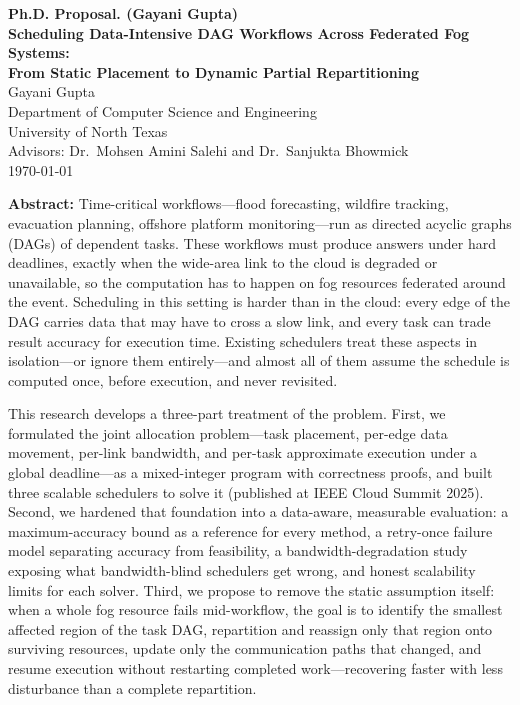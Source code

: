 \documentclass[11pt]{article}
\begin{document}
\begin{center}
{\Large \textbf{Ph.D. Proposal. (Gayani Gupta)}}\\[14pt]
{\LARGE \textbf{Scheduling Data-Intensive DAG Workflows Across
Federated Fog Systems:}}\\[6pt]
{\LARGE \textbf{From Static Placement to Dynamic Partial
Repartitioning}}\\[18pt]
Gayani Gupta\\
Department of Computer Science and Engineering\\
University of North Texas\\
Advisors: Dr.\ Mohsen Amini Salehi and Dr.\ Sanjukta Bhowmick\\[8pt]
\today
\end{center}

\vspace{12pt}

\noindent\textbf{Abstract:}
Time-critical workflows---flood forecasting, wildfire tracking,
evacuation planning, offshore platform monitoring---run as
directed acyclic graphs (DAGs) of dependent tasks. These
workflows must produce answers under hard deadlines, exactly
when the wide-area link to the cloud is degraded or unavailable,
so the computation has to happen on fog resources federated
around the event. Scheduling in this setting is harder than in
the cloud: every edge of the DAG carries data that may have to
cross a slow link, and every task can trade result accuracy for
execution time. Existing schedulers treat these aspects in
isolation---or ignore them entirely---and almost all of them
assume the schedule is computed once, before execution, and
never revisited.

This research develops a three-part treatment of the problem.
First, we formulated the joint allocation problem---task
placement, per-edge data movement, per-link bandwidth, and
per-task approximate execution under a global deadline---as a
mixed-integer program with correctness proofs, and built three
scalable schedulers to solve it (published at IEEE Cloud Summit
2025). Second, we hardened that foundation into a data-aware,
measurable evaluation: a maximum-accuracy bound as a reference
for every method, a retry-once failure model separating accuracy
from feasibility, a bandwidth-degradation study exposing what
bandwidth-blind schedulers get wrong, and honest scalability
limits for each solver. Third, we propose to remove the static
assumption itself: when a whole fog resource fails mid-workflow,
the goal is to identify the smallest affected region of the task
DAG, repartition and reassign only that region onto surviving
resources, update only the communication paths that changed, and
resume execution without restarting completed work---recovering
faster with less disturbance than a complete repartition.
\end{document}
